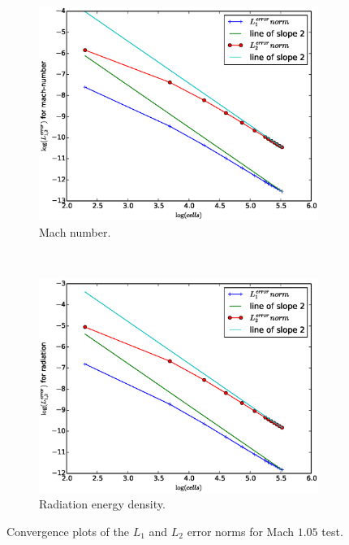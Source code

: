 \documentclass[times,doublespace]{fldauth}%
\begin{document}
\begin{figure}[H]
    \begin{subfigure}{0.5\textwidth}
    \centering
    \includegraphics[width=\linewidth]{figures/cst-xs/mach-1p05-mach-number-convergence.eps}
    \caption{Mach number.}\label{fig:mach-1p05-cst-xs-mach-conv}
    \end{subfigure}
    ~
    \begin{subfigure}{0.5\textwidth}
    \centering
    \includegraphics[width=\linewidth]{figures/cst-xs/mach-1p05-radiation-convergence.eps}
    \caption{Radiation energy density.}\label{fig:mach-1p05-cst-xs-radiation-conv}
    \end{subfigure}        
\caption{Convergence plots of the $L_1$ and $L_2$ error norms for Mach $1.05$ test.}\label{fig:mach-1p05-cst-xs-conv}    
\end{figure}
\end{document}
